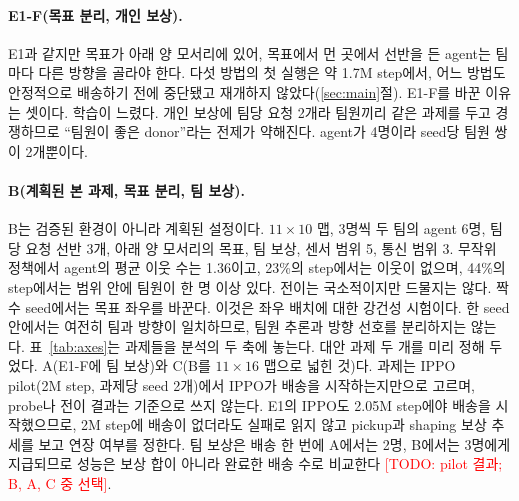 \documentclass[twocolumn,10pt]{article}
\theoremstyle{remark}
\newcommand{\todo}[1]{\textcolor{red}{[TODO: #1]}}
\begin{document}
\paragraph{E1-F(목표 분리, 개인 보상).} E1과 같지만 목표가 아래 양 모서리에 있어, 목표에서 먼 곳에서 선반을 든 agent는 팀마다
다른 방향을 골라야 한다. 다섯 방법의 첫 실행은 약 1.7M step에서, 어느 방법도 안정적으로 배송하기 전에 중단됐고 재개하지
않았다(\ref{sec:main}절). E1-F를 바꾼 이유는 셋이다. 학습이 느렸다. 개인 보상에 팀당 요청 2개라 팀원끼리 같은 과제를 두고
경쟁하므로 ``팀원이 좋은 donor''라는 전제가 약해진다. agent가 4명이라 seed당 팀원 쌍이 2개뿐이다.

\paragraph{B(계획된 본 과제, 목표 분리, 팀 보상).} B는 검증된 환경이 아니라 계획된 설정이다. $11\times10$ 맵, 3명씩 두 팀의 agent 6명, 팀당 요청 선반 3개, 아래 양 모서리의 목표,
팀 보상, 센서 범위 5, 통신 범위 3. 무작위 정책에서 agent의 평균 이웃 수는 1.36이고, 23\%의 step에서는 이웃이 없으며, 44\%의
step에서는 범위 안에 팀원이 한 명 이상 있다. 전이는 국소적이지만 드물지는 않다. 짝수 seed에서는 목표 좌우를 바꾼다. 이것은
좌우 배치에 대한 강건성 시험이다. 한 seed 안에서는 여전히 팀과 방향이 일치하므로, 팀원 추론과 방향 선호를 분리하지는 않는다.
표~\ref{tab:axes}는 과제들을 분석의 두 축에 놓는다. 대안 과제 두 개를 미리 정해 두었다. A(E1-F에 팀 보상)와 C(B를
$11\times16$ 맵으로 넓힌 것)다. 과제는 IPPO pilot(2M step, 과제당 seed 2개)에서 IPPO가 배송을 시작하는지만으로 고르며, probe나
전이 결과는 기준으로 쓰지 않는다. E1의 IPPO도 2.05M step에야 배송을 시작했으므로, 2M step에 배송이 없더라도 실패로 읽지 않고
pickup과 shaping 보상 추세를 보고 연장 여부를 정한다. 팀 보상은 배송 한 번에 A에서는 2명, B에서는 3명에게 지급되므로 성능은
보상 합이 아니라 완료한 배송 수로 비교한다 \todo{pilot 결과; B, A, C 중 선택}.

\begin{table}[t]
\centering
\small
{}
\caption{분석의 두 축에 놓은 과제. E1: 명제~\ref{prop:nonid}로 식별 가능성이 배제되고, 고정된 커리큘럼 모델에서는 팀원보다
다른 팀 agent의 critic과 섞을 때 더 도움이 됐다. E1-F, B, A: 목표 배치상 식별 가능할 것으로 예상하며 호환성은 측정 예정이다
\todo{측정 후 B 위치 확정}.}
\label{tab:axes}
\end{table}
\end{document}
